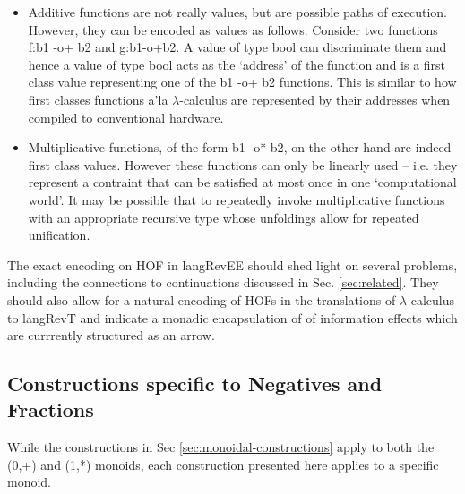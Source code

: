 \documentclass[preprint]{sigplanconf}
\newcommand{\lcal}{\ensuremath{\lambda}-calculus\xspace}
\begin{document}
\begin{itemize}
\item 
Additive functions are not really values, but are possible paths of
execution. However, they can be encoded as values as follows: Consider
two functions {{f:b1 -o+ b2}} and {{g:b1-o+b2}}. A value of type
{{bool}} can discriminate them and hence a value of type {{bool}} acts
as the `address' of the function and is a first class value
representing one of the {{b1 -o+ b2}} functions.  This is similar to
how first classes functions a'la \lcal are represented by their
addresses when compiled to conventional hardware.

\item
Multiplicative functions, of the form {{b1 -o* b2}}, on the other hand
are indeed first class values. However these functions can only be
linearly used -- i.e. they represent a contraint that can be satisfied
at most once in one `computational world'. It may be possible that to
repeatedly invoke multiplicative functions with an appropriate
recursive type whose unfoldings allow for repeated unification.
\end{itemize}

The exact encoding on HOF in {{langRevEE}} should shed light on
several problems, including the connections to continuations discussed
in Sec. \ref{sec:related}. They should also allow for a natural
encoding of HOFs in the translations of \lcal to {{langRevT}} and
indicate a monadic encapsulation of of information effects which are
currrently structured as an arrow.


\subsection{Constructions specific to Negatives and Fractions}
\label{sec:specific-constructions}

While the constructions in Sec \ref{sec:monoidal-constructions} apply
to both the {{(0,+)}} and {{(1,*)}} monoids, each construction
presented here applies to a specific monoid. 
\end{document}
